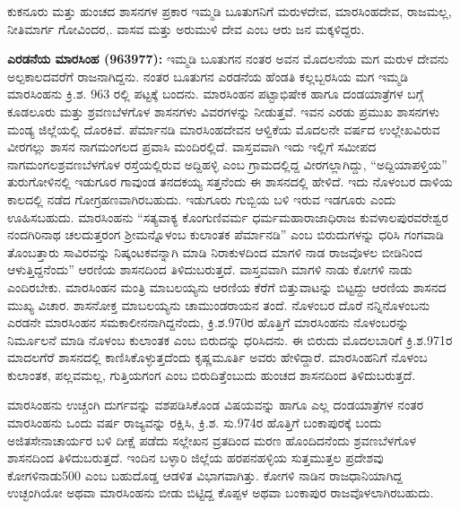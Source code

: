ಕುಕನೂರು ಮತ್ತು ಹುಂಚದ ಶಾಸನಗಳ ಪ್ರಕಾರ ಇಮ್ಮಡಿ ಬೂತುಗನಿಗೆ ಮರುಳದೇವ, ಮಾರಸಿಂಹದೇವ, ರಾಜಮಲ್ಲ, ನೀತಿಮಾರ್ಗ ಗೋವಿಂದರ,. ವಾಸವ ಮತ್ತು ಅರುಮುಳಿ ದೇವ ಎಂಬ ಆರು ಜನ ಮಕ್ಕಳಿದ್ದರು.

\textbf{ ಎರಡನೆಯ ಮಾರಸಿಂಹ (963\general{\enginline{-}}977):} ಇಮ್ಮಡಿ ಬೂತುಗನ ನಂತರ ಅವನ ಮೊದಲನೆಯ ಮಗ ಮರುಳ ದೇವನು ಅಲ್ಪಕಾಲದವರೆಗೆ ರಾಜನಾಗಿದ್ದನು. ನಂತರ ಬೂತುಗನ ಎರಡನೆಯ ಹೆಂಡತಿ ಕಲ್ಲಬ್ಬರಸಿಯ ಮಗ ಇಮ್ಮಡಿ ಮಾರಸಿಂಹನು ಕ್ರಿ.ಶ. 963 ರಲ್ಲಿ ಪಟ್ಟಕ್ಕೆ ಬಂದನು. ಮಾರಸಿಂಹನ ಪಟ್ಟಾಭಿಷೇಕ ಹಾಗೂ ದಂಡಯಾತ್ರೆಗಳ ಬಗ್ಗೆ ಕೂಡಲೂರು ಮತ್ತು ಶ್ರವಣಬೆಳಗೊಳ ಶಾಸನಗಳು ವಿವರಗಳನ್ನು ನೀಡುತ್ತವೆ. ಇವನ ಎರಡು ಪ್ರಮುಖ ಶಾಸನಗಳು ಮಂಡ್ಯ ಜಿಲ್ಲೆಯಲ್ಲಿ ದೊರಕಿವೆ. ಪೆರ್ಮಾನಡಿ ಮಾರಸಿಂಹದೇವನ ಆಳ್ವಿಕೆಯ ಮೊದಲನೇ ವರ್ಷದ ಉಲ್ಲೇಖವಿರುವ ವೀರಗಲ್ಲು ಶಾಸನ ನಾಗಮಂಗಲದ ಪ್ರವಾಸಿ ಮಂದಿರಲ್ಲಿದೆ. ವಾಸ್ತವವಾಗಿ ಇದು ಇಲ್ಲಿಗೆ ಸಮೀಪದ ನಾಗಮಂಗಲ\enginline{-}ಶ್ರವಣಬೆಳಗೊಳ ರಸ್ತೆಯಲ್ಲಿರುವ ಅದ್ದಿಹಳ್ಳಿ ಎಂಬ ಗ್ರಾಮದಲ್ಲಿದ್ದ ವೀರಗಲ್ಲಾಗಿದ್ದು, “ಅದ್ದಿಯಾಪಳ್ತಿಯ” ತುರುಗೋಳಿನಲ್ಲಿ ಇಡುಗೂರ ಗಾವುಂಡ ತನದಕಯ್ಯ ಸತ್ತನೆಂದು ಈ ಶಾಸನದಲ್ಲಿ ಹೇಳಿದೆ. ಇದು ನೊಳಂಬರ ದಾಳಿಯ ಕಾಲದಲ್ಲಿ ನಡೆದ ಗೋಗ್ರಹಣವಾಗಿರಬಹುದು. ಇಡುಗೂರು ಗುಬ್ಬಿಯ ಬಳಿ ಇರುವ ಇಡಗೂರು ಎಂದು ಊಹಿಸಬಹುದು. ಮಾರಸಿಂಹನು “ಸತ್ಯವಾಕ್ಯ ಕೊಂಗುಣಿವರ್ಮ ಧರ್ಮಮಹಾರಾಜಾಧಿರಾಜ ಕುವಳಾಲಪುರವರೇಶ್ವರ ನಂದಗಿರಿನಾಥ ಚಲದುತ್ತರಂಗ ಶ‍್ರೀಮನ್ನೊಳಂಬ ಕುಲಾಂತಕ ಪೆರ್ಮಾನಡಿ” ಎಂಬ ಬಿರುದುಗಳನ್ನು ಧರಿಸಿ ಗಂಗವಾಡಿ ತೊಂಬತ್ತಾರು ಸಾವಿರವನ್ನು ನಿಷ್ಕಂಟಕವನ್ನಾಗಿ ಮಾಡಿ ನಿರಾಕುಳದಿಂದ ಮಾಗಳಿ ನಾಡ ರಾಜವೊಳಲ ಬೀಡಿನಿಂದ ಆಳುತ್ತಿದ್ದನೆಂದು” ಆರಣಿಯ ಶಾಸನದಿಂದ ತಿಳಿದುಬರುತ್ತದೆ. ವಾಸ್ತವವಾಗಿ ಮಾಗಳಿ ನಾಡು ಕೋಗಳಿ ನಾಡು ಎಂದಿರಬೇಕು. ಮಾರಸಿಂಹನ ಮಂತ್ರಿ ಮಾಬಲಯ್ಯನು ಆರಣಿಯ ಕೆರೆಗೆ ಬಿತ್ತುವಾಟನ್ನು ಬಿಟ್ಟದ್ದು ಆರಣಿಯ ಶಾಸನದ ಮುಖ್ಯ ವಿಚಾರ. ಶಾಸನೋಕ್ತ ಮಾಬಲಯ್ಯನು ಚಾಮುಂಡರಾಯನ ತಂದೆ. ನೊಳಂಬರ ದೊರೆ ನನ್ನಿನೊಳಂಬನು ಎರಡನೇ ಮಾರಸಿಂಹನ ಸಮಕಾಲೀನನಾಗಿದ್ದನೆಂದು, ಕ್ರಿ.ಶ.970ರ ಹೊತ್ತಿಗೆ ಮಾರಸಿಂಹನು ನೊಳಂಬರನ್ನು ನಿರ್ಮೂಲನೆ ಮಾಡಿ ನೊಳಂಬ ಕುಲಾಂತಕ ಎಂಬ ಬಿರುದನ್ನು ಧರಿಸಿದನು. ಈ ಬಿರುದು ಮೊದಲಬಾರಿಗೆ ಕ್ರಿ.ಶ.971ರ ಮಾದಲಗೆರೆ ಶಾಸನದಲ್ಲಿ ಕಾಣಿಸಿಕೊಳ್ಳುತ್ತದೆಂದು ಕೃಷ್ಣಮೂರ್ತಿ ಅವರು ಹೇಳಿದ್ದಾರೆ. ಮಾರಸಿಂಹನಿಗೆ ನೊಳಂಬ ಕುಲಾಂತಕ, ಪಲ್ಲವಮಲ್ಲ, ಗುತ್ತಿಯಗಂಗ ಎಂಬ ಬಿರುದಿತ್ತೆಂಬುದು ಹುಂಚದ ಶಾಸನದಿಂದ ತಿಳಿದುಬರುತ್ತದೆ.

ಮಾರಸಿಂಹನು ಉಚ್ಚಂಗಿ ದುರ್ಗವನ್ನು ವಶಪಡಿಸಿಕೊಂಡ ವಿಷಯವನ್ನು ಹಾಗೂ ಎಲ್ಲ ದಂಡಯಾತ್ರೆಗಳ ನಂತರ ಮಾರಸಿಂಹನು ಒಂದು ವರ್ಷ ರಾಜ್ಯವನ್ನು ರಕ್ಷಿಸಿ, ಕ್ರಿ.ಶ. ಸು.974ರ ಹೊತ್ತಿಗೆ ಬಂಕಾಪುರಕ್ಕೆ ಬಂದು ಅಜಿತಸೇನಾಚಾರ್ಯರ ಬಳಿ ದೀಕ್ಷೆ ಪಡೆದು ಸಲ್ಲೇಖನ ವ್ರತದಿಂದ ಮರಣ ಹೊಂದಿದನೆಂದು ಶ್ರವಣಬೆಳಗೊಳ ಶಾಸನದಿಂದ ತಿಳಿದುಬರುತ್ತದೆ. ಇಂದಿನ ಬಳ್ಳಾರಿ ಜಿಲ್ಲೆಯ ಹರಪನಹಳ್ಳಿಯ ಸುತ್ತಮುತ್ತಲ ಪ್ರದೇಶವು ಕೋಗಳಿನಾಡು\enginline{-}500 ಎಂಬ ಬಹುದೊಡ್ಡ ಆಡಳಿತ ವಿಭಾಗವಾಗಿತ್ತು. ಕೋಗಳಿ ನಾಡಿನ ರಾಜಧಾನಿಯಾಗಿದ್ದ ಉಚ್ಛಂಗಿಯೋ ಅಥವಾ ಮಾರಸಿಂಹನು ಬೀಡು ಬಿಟ್ಟಿದ್ದ ಕೊಪ್ಪಳ ಅಥವಾ ಬಂಕಾಪುರ ರಾಜವೊಳಲಾಗಿರಬಹುದು.

